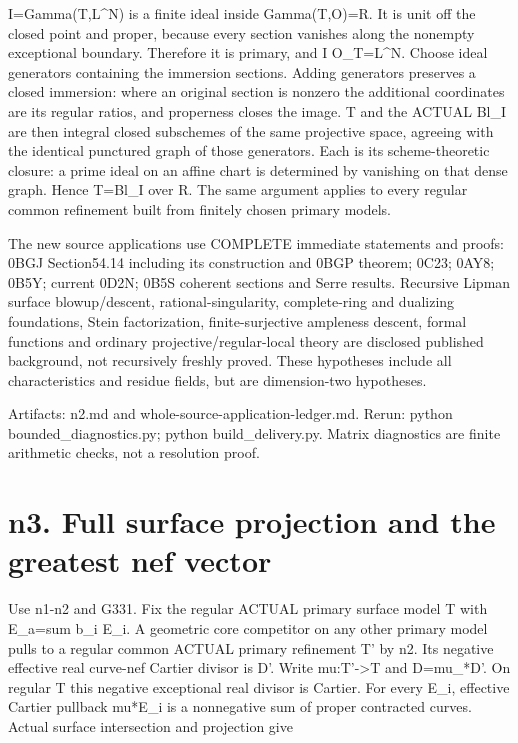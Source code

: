 \documentclass[11pt]{article}
\begin{document}
I=Gamma(T,L\textasciicircum{}N) is a finite ideal inside Gamma(T,O)=R. It is unit off the closed point and proper, because every section vanishes along the nonempty exceptional boundary. Therefore it is primary, and I O\_T=L\textasciicircum{}N. Choose ideal generators containing the immersion sections. Adding generators preserves a closed immersion: where an original section is nonzero the additional coordinates are its regular ratios, and properness closes the image. T and the ACTUAL Bl\_I are then integral closed subschemes of the same projective space, agreeing with the identical punctured graph of those generators. Each is its scheme-theoretic closure: a prime ideal on an affine chart is determined by vanishing on that dense graph. Hence T=Bl\_I over R. The same argument applies to every regular common refinement built from finitely chosen primary models.

The new source applications use COMPLETE immediate statements and proofs: 0BGJ Section54.14 including its construction and 0BGP theorem; 0C23; 0AY8; 0B5Y; current 0D2N; 0B5S coherent sections and Serre results. Recursive Lipman surface blowup/descent, rational-singularity, complete-ring and dualizing foundations, Stein factorization, finite-surjective ampleness descent, formal functions and ordinary projective/regular-local theory are disclosed published background, not recursively freshly proved. These hypotheses include all characteristics and residue fields, but are dimension-two hypotheses.

Artifacts: n2.md and whole-source-application-ledger.md. Rerun: python bounded\_diagnostics.py; python build\_delivery.py. Matrix diagnostics are finite arithmetic checks, not a resolution proof.


\section*{n3. Full surface projection and the greatest nef vector}

Use n1-n2 and G331. Fix the regular ACTUAL primary surface model T with E\_a=sum b\_i E\_i. A geometric core competitor on any other primary model pulls to a regular common ACTUAL primary refinement T' by n2. Its negative effective real curve-nef Cartier divisor is D'. Write mu:T'->T and D=mu\_*D'. On regular T this negative exceptional real divisor is Cartier. For every E\_i, effective Cartier pullback mu*E\_i is a nonnegative sum of proper contracted curves. Actual surface intersection and projection give
\end{document}
